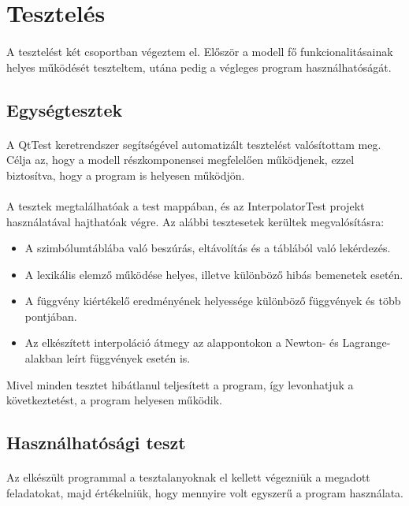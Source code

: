 \documentclass[12pt]{report}
\begin{document}
\newpage
\section{Tesztelés}
\paragraph{}
A tesztelést két csoportban végeztem el. Először a modell fő funkcionalitásainak helyes működését teszteltem, utána pedig a végleges program használhatóságát.
\subsection{Egységtesztek}
\paragraph{}
A QtTest keretrendszer segítségével automatizált tesztelést valósítottam meg. Célja az, hogy a modell részkomponensei megfelelően működjenek, ezzel biztosítva, hogy a program is helyesen működjön.
\paragraph{}
A tesztek megtalálhatóak a test mappában, és az InterpolatorTest projekt használatával hajthatóak végre. Az alábbi tesztesetek kerültek megvalósításra:
\begin{itemize}
\item A szimbólumtáblába való beszúrás, eltávolítás és a táblából való lekérdezés.
\item A lexikális elemző működése helyes, illetve különböző hibás bemenetek esetén.
\item A függvény kiértékelő eredményének helyessége különböző függvények és több pontjában.
\item Az elkészített interpoláció átmegy az alappontokon a Newton- és Lagrange-alakban leírt függvények esetén is.
\end{itemize}
Mivel minden tesztet hibátlanul teljesített a program, így levonhatjuk a következtetést, a program helyesen működik.
\subsection{Használhatósági teszt}
\paragraph{}
Az elkészült programmal a tesztalanyoknak el kellett végezniük a megadott feladatokat, majd értékelniük, hogy mennyire volt egyszerű a program használata.
\end{document}

